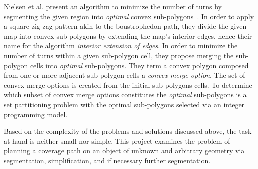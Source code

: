 Nielsen et al. present an algorithm to minimize the number of turns by segmenting the given region into \textit{optimal} convex sub-polygons~\cite{IntEdgeExt}.
In order to apply a square zig-zag pattern akin to the boustrophedon path, they divide the given map into convex sub-polygons by extending the map's interior edges, hence their name for the algorithm \textit{interior extension of edges}.
In order to minimize the number of turns within a given sub-polygon cell, they propose merging the sub-polygon cells into \textit{optimal} sub-polygons.
They term a convex polygon composed from one or more adjacent sub-polygon cells a \textit{convex merge option}.
The set of convex merge options is created from the initial sub-polygons cells.
To determine which subset of convex merge options constitutes the \textit{optimal} sub-polygons is a set partitioning problem with the optimal sub-polygons selected via an integer programming model.


Based on the complexity of the problems and solutions discussed above, the task at hand is neither small nor simple.
This project examines the problem of planning a coverage path on an object of unknown and arbitrary geometry via segmentation, simplification, and if necessary further segmentation.

